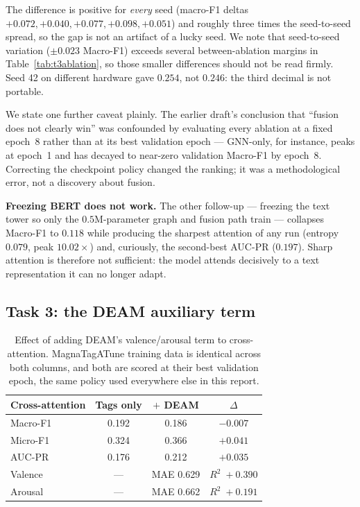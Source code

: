 \documentclass[conference]{IEEEtran}
\begin{document}
\noindent The difference is positive for \emph{every} seed (macro-F1 deltas
$+0.072, +0.040, +0.077, +0.098, +0.051$) and roughly three times the
seed-to-seed spread, so the gap is not an artifact of a lucky seed. We note
that seed-to-seed variation ($\pm0.023$ Macro-F1) exceeds several
between-ablation margins in Table~\ref{tab:t3ablation}, so those smaller
differences should not be read firmly. Seed 42 on different hardware gave
$0.254$, not $0.246$: the third decimal is not portable.

We state one further caveat plainly. The earlier draft's
conclusion that ``fusion does not clearly win'' was confounded by evaluating
every ablation at a fixed epoch~8 rather than at its best validation epoch ---
GNN-only, for instance, peaks at epoch~1 and has decayed to near-zero
validation Macro-F1 by epoch~8. Correcting the checkpoint policy changed the
ranking; it was a methodological error, not a discovery about fusion.

\textbf{Freezing BERT does not work.} The other follow-up --- freezing the text
tower so only the $0.5$M-parameter graph and fusion path train --- collapses
Macro-F1 to $0.118$ while producing the sharpest attention of any run (entropy
$0.079$, peak $10.02\times$) and, curiously, the second-best AUC-PR ($0.197$).
Sharp attention is therefore not sufficient: the model attends decisively to a
text representation it can no longer adapt.

\subsection{Task 3: the DEAM auxiliary term}

\begin{table}[H]
\centering\small
\caption{Effect of adding DEAM's valence/arousal term to cross-attention.
MagnaTagATune training data is identical across both columns, and both are
scored at their best validation epoch, the same policy used everywhere else in
this report.}
\label{tab:deam}
\begin{tabular}{lccc}
\toprule
Cross-attention & Tags only & $+$ DEAM & $\Delta$ \\
\midrule
Macro-F1 & 0.192 & 0.186 & $-0.007$ \\
Micro-F1 & 0.324 & 0.366 & $+0.041$ \\
AUC-PR & 0.176 & 0.212 & $+0.035$ \\
\midrule
Valence & --- & MAE 0.629 & $R^2\;+0.390$ \\
Arousal & --- & MAE 0.662 & $R^2\;+0.191$ \\
\bottomrule
\end{tabular}
\end{table}
\end{document}

